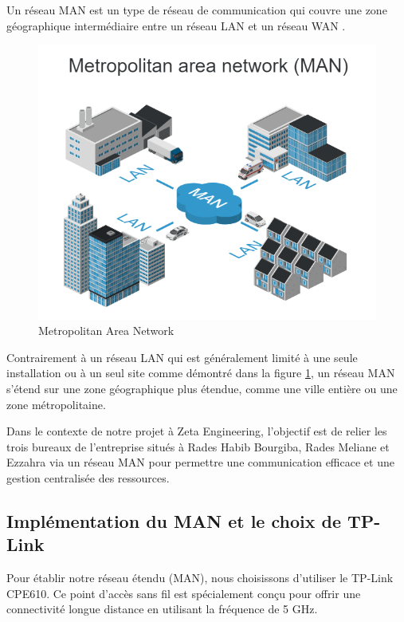 Un réseau MAN est un type de réseau de communication qui couvre une zone géographique intermédiaire entre un réseau LAN et un réseau WAN \cite{sze1985metropolitan}. 


\begin{figure}[H]
 \centering
    \includegraphics[width=15cm]{Images/network-man1.png}
    \caption{Metropolitan Area Network}
    \label{Chap2.3.1}
\end{figure}  

Contrairement à un réseau LAN qui est généralement limité à une seule installation ou à un seul site comme démontré dans la figure \ref{Chap2.3.1}, un réseau MAN s'étend sur une zone géographique plus étendue, comme une ville entière ou une zone métropolitaine. 


Dans le contexte de notre projet à Zeta Engineering, l'objectif est de relier les trois bureaux de l'entreprise situés à Rades Habib Bourgiba, Rades Meliane et Ezzahra via un réseau MAN pour permettre une communication efficace et une gestion centralisée des ressources. 


\subsection{Implémentation du MAN et le choix de TP-Link}

Pour établir notre réseau étendu (MAN), nous choisissons  d'utiliser le TP-Link CPE610. Ce point d'accès sans fil est spécialement conçu pour offrir une connectivité longue distance en utilisant la fréquence de 5 GHz.

